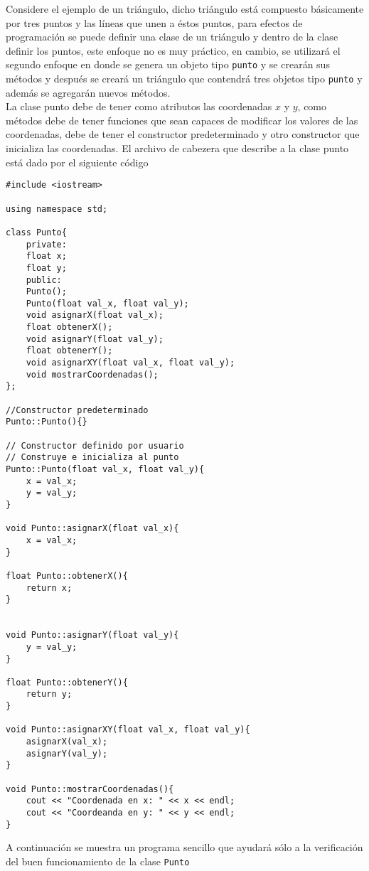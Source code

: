 \documentclass[12pt]{extarticle}
\newcommand{\<}{\langle}
\renewcommand{\>}{\rangle}
\theoremstyle{definition}
\begin{document}
Considere el ejemplo de un triángulo, dicho triángulo está compuesto básicamente por tres puntos y las líneas que unen a éstos puntos, para efectos de programación se puede definir una clase de un triángulo y dentro de la clase definir los puntos, este enfoque no es muy práctico, en cambio, se utilizará el segundo enfoque en donde se genera un objeto tipo \verb|punto| y se crearán sus métodos y después se creará un triángulo que contendrá tres objetos tipo \verb|punto| y además se agregarán nuevos métodos.\\ 

La clase punto debe de tener como atributos las coordenadas $x$ y $y$, como métodos debe de tener funciones que sean capaces de modificar los valores de las coordenadas, debe de tener el constructor predeterminado y otro constructor que inicializa las coordenadas. El archivo de cabezera que describe a la clase punto está dado por el siguiente código


\begin{lstlisting}[caption={Definición e implementación de la clase Punto, el archivo se debe de llamar punto.h},captionpos=b]
#include <iostream>

using namespace std;

class Punto{
	private:
	float x;
	float y;
	public:
	Punto();
	Punto(float val_x, float val_y);
	void asignarX(float val_x);
	float obtenerX();
	void asignarY(float val_y);
	float obtenerY();
	void asignarXY(float val_x, float val_y);
	void mostrarCoordenadas();
};

//Constructor predeterminado
Punto::Punto(){}

// Constructor definido por usuario
// Construye e inicializa al punto
Punto::Punto(float val_x, float val_y){
	x = val_x;
	y = val_y;
}

void Punto::asignarX(float val_x){
	x = val_x;
}

float Punto::obtenerX(){
	return x;
}


void Punto::asignarY(float val_y){
	y = val_y;
}

float Punto::obtenerY(){
	return y;
}

void Punto::asignarXY(float val_x, float val_y){
	asignarX(val_x);
	asignarY(val_y);
}

void Punto::mostrarCoordenadas(){
	cout << "Coordenada en x: " << x << endl;
	cout << "Coordeanda en y: " << y << endl;
}
\end{lstlisting}


A continuación se muestra un programa sencillo que ayudará sólo a la verificación del buen funcionamiento de la clase \verb|Punto| 
\end{document}
